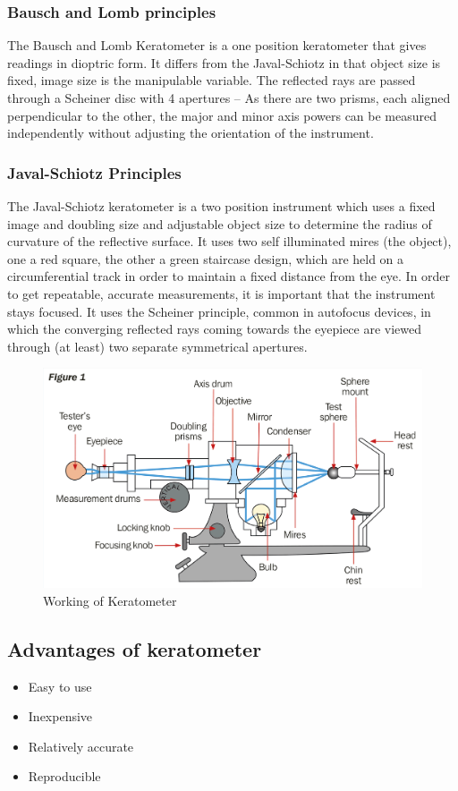 \documentclass{article}
\begin{document}
\subsubsection{Bausch and Lomb principles}
The Bausch and Lomb Keratometer is a one position keratometer that gives readings in dioptric form. It differs from the Javal-Schiotz in that object size is fixed, image size is the manipulable variable. The reflected rays are passed through a Scheiner disc with 4 apertures – As there are two prisms, each aligned perpendicular to the other, the major and minor axis powers can be measured independently without adjusting the orientation of the instrument.
\subsubsection{Javal-Schiotz Principles}
The Javal-Schiotz keratometer is a two position instrument which uses a fixed image and doubling size and adjustable object size to determine the radius of curvature of the reflective surface. It uses two self illuminated mires (the object), one a red square, the other a green staircase design, which are held on a circumferential track in order to maintain a fixed distance from the eye. In order to get repeatable, accurate measurements, it is important that the instrument stays focused. It uses the Scheiner principle, common in autofocus devices, in which the converging reflected rays coming towards the eyepiece are viewed through (at least) two separate symmetrical apertures.
\begin{figure} [h]
    \centering
    \includegraphics[scale=0.2]{figure12.png}
    \caption{Working of Keratometer}
    \label{fig:keratometer working}
\end{figure}
\subsection{Advantages of keratometer}
\begin{itemize}
\item Easy to use	
\item Inexpensive
\item Relatively accurate
\item Reproducible
\end{itemize}
\end{document}
